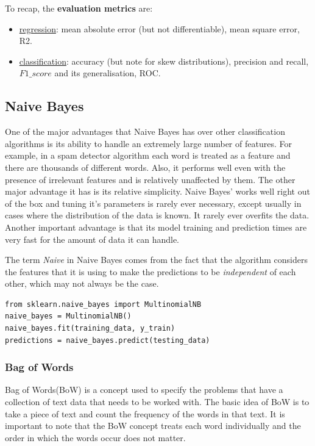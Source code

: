 \documentclass[12pt]{article}
\begin{document}
To recap, the \textbf{evaluation metrics} are:
\begin{itemize}
	\item \underline{regression}: mean absolute error (but not differentiable), mean square error, R2.
	\item \underline{classification}: accuracy (but note for skew distributions), precision and recall, $F1\_score$ and its generalisation, ROC.
\end{itemize}

\subsection{Naive Bayes} \label{Naive_Bayes} 
One of the major advantages that Naive Bayes has over other classification algorithms is its ability to handle an extremely large number of features. For example, in a spam detector algorithm each word is treated as a feature and there are thousands of different words. Also, it performs well even with the presence of irrelevant features and is relatively unaffected by them. The other major advantage it has is its relative simplicity. Naive Bayes' works well right out of the box and tuning it's parameters is rarely ever necessary, except usually in cases where the distribution of the data is known. It rarely ever overfits the data. Another important advantage is that its model training and prediction times are very fast for the amount of data it can handle. 

The term \textit{Naive} in Naive Bayes comes from the fact that the algorithm considers the features that it is using to make the predictions to be \textit{independent} of each other, which may not always be the case.

\begin{lstlisting}
from sklearn.naive_bayes import MultinomialNB
naive_bayes = MultinomialNB()
naive_bayes.fit(training_data, y_train)
predictions = naive_bayes.predict(testing_data)
\end{lstlisting}

\subsubsection{Bag of Words}
 Bag of Words(BoW) is a concept used to specify the problems that have a collection of text data that needs to be worked with. The basic idea of BoW is to take a piece of text and count the frequency of the words in that text. It is important to note that the BoW concept treats each word individually and the order in which the words occur does not matter.
\end{document}
